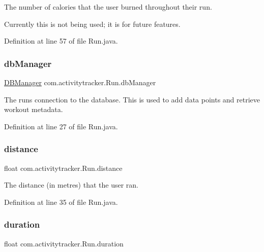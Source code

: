 The number of calories that the user burned throughout their run.

Currently this is not being used; it is for future features. 

Definition at line 57 of file Run.\+java.

\mbox{\label{classcom_1_1activitytracker_1_1_run_ab90e32eda9f4c671ae3575f971edca6b}} 
\subsubsection{\texorpdfstring{dbManager}{dbManager}}
{\footnotesize\ttfamily \mbox{\hyperlink{classcom_1_1activitytracker_1_1_d_b_manager}{D\+B\+Manager}} com.\+activitytracker.\+Run.\+db\+Manager\hspace{0.3cm}{\ttfamily [private]}}

The run\textquotesingle{}s connection to the database. This is used to add data points and retrieve workout metadata. 

Definition at line 27 of file Run.\+java.

\mbox{\label{classcom_1_1activitytracker_1_1_run_a7b4ca8c4ecea4da1653f03b8c8fc16a8}} 
\subsubsection{\texorpdfstring{distance}{distance}}
{\footnotesize\ttfamily float com.\+activitytracker.\+Run.\+distance\hspace{0.3cm}{\ttfamily [private]}}

The distance (in metres) that the user ran. 

Definition at line 35 of file Run.\+java.

\mbox{\label{classcom_1_1activitytracker_1_1_run_a5e38d293d29d4b65c9290ff4bee82e03}} 
\subsubsection{\texorpdfstring{duration}{duration}}
{\footnotesize\ttfamily float com.\+activitytracker.\+Run.\+duration\hspace{0.3cm}{\ttfamily [private]}}

